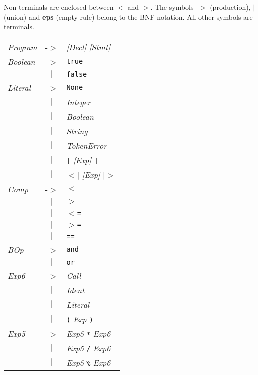 \documentclass{article}
\begin{document}
Non-terminals are enclosed between $<$ and $>$.
The symbols -$>$ (production),  \textbf{$|$}  (union)
and \textbf{eps} (empty rule) belong to the BNF notation.
All other symbols are terminals. \\
\begin{center}\begin{tabular}{lll}
\textit{Program} & -$>$ & \textit{[Decl]} \textit{[Stmt]} \\
\textit{Boolean} & -$>$ & \texttt{true} \\
 & \multicolumn{1}{c}{\textbf{$|$}} & \texttt{false} \\
\textit{Literal} & -$>$ & \texttt{None} \\
 & \multicolumn{1}{c}{\textbf{$|$}} & \textit{Integer} \\
 & \multicolumn{1}{c}{\textbf{$|$}} & \textit{Boolean} \\
 & \multicolumn{1}{c}{\textbf{$|$}} & \textit{String} \\
 & \multicolumn{1}{c}{\textbf{$|$}} & \textit{TokenError} \\
 & \multicolumn{1}{c}{\textbf{$|$}} & \texttt{[} \textit{[Exp]} \texttt{]} \\
 & \multicolumn{1}{c}{\textbf{$|$}} & \texttt{$<$$|$} \textit{[Exp]} \texttt{$|$$>$} \\
\textit{Comp} & -$>$ & \texttt{$<$} \\
 & \multicolumn{1}{c}{\textbf{$|$}} & \texttt{$>$} \\
 & \multicolumn{1}{c}{\textbf{$|$}} & \texttt{$<$=} \\
 & \multicolumn{1}{c}{\textbf{$|$}} & \texttt{$>$=} \\
 & \multicolumn{1}{c}{\textbf{$|$}} & \texttt{==} \\
\textit{BOp} & -$>$ & \texttt{and} \\
 & \multicolumn{1}{c}{\textbf{$|$}} & \texttt{or} \\
\textit{Exp6} & -$>$ & \textit{Call} \\
 & \multicolumn{1}{c}{\textbf{$|$}} & \textit{Ident} \\
 & \multicolumn{1}{c}{\textbf{$|$}} & \textit{Literal} \\
 & \multicolumn{1}{c}{\textbf{$|$}} & \texttt{(} \textit{Exp} \texttt{)} \\
\textit{Exp5} & -$>$ & \textit{Exp5} \texttt{*} \textit{Exp6} \\
 & \multicolumn{1}{c}{\textbf{$|$}} & \textit{Exp5} \texttt{/} \textit{Exp6} \\
 & \multicolumn{1}{c}{\textbf{$|$}} & \textit{Exp5} \texttt{\%} \textit{Exp6} \\

\end{tabular}
\end{center}
\end{document}
